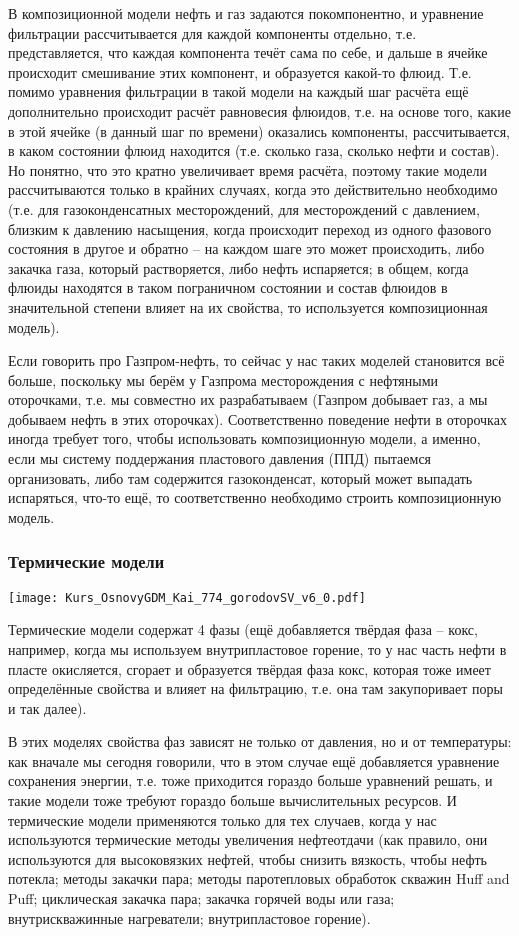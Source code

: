 \documentclass[main.tex]{subfiles}
\begin{document}
В композиционной модели нефть и газ задаются покомпонентно, и уравнение фильтрации рассчитывается для каждой компоненты отдельно, т.е. представляется, что каждая компонента течёт сама по себе, и дальше в ячейке происходит смешивание этих компонент, и образуется какой-то флюид.
Т.е. помимо уравнения фильтрации в такой модели на каждый шаг расчёта ещё дополнительно происходит расчёт равновесия флюидов, т.е. на основе того, какие в этой ячейке (в данный шаг по времени) оказались компоненты, рассчитывается, в каком состоянии флюид находится (т.е. сколько газа, сколько нефти и состав).
Но понятно, что это кратно увеличивает время расчёта, поэтому такие модели рассчитываются только в крайних случаях, когда это действительно необходимо (т.е. для газоконденсатных месторождений, для месторождений с давлением, близким к давлению насыщения, когда происходит переход из одного фазового состояния в другое и обратно -- на каждом шаге это может происходить, либо закачка газа, который растворяется, либо нефть испаряется; в общем, когда флюиды находятся в таком пограничном состоянии и состав флюидов в значительной степени влияет на их свойства, то используется композиционная модель).

Если говорить про Газпром-нефть, то сейчас у нас таких моделей становится всё больше, поскольку мы берём у Газпрома месторождения с нефтяными оторочками, т.е. мы совместно их разрабатываем (Газпром добывает газ, а мы добываем нефть в этих оторочках).
Соответственно поведение нефти в оторочках иногда требует того, чтобы использовать композиционную модели, а именно, если мы систему поддержания пластового давления (ППД) пытаемся организовать, либо там содержится газоконденсат, который может выпадать испаряться, что-то ещё, то соответственно необходимо строить композиционную модель.

\subsubsection{Термические модели}

\texttt{[image: Kurs\_OsnovyGDM\_Kai\_774\_gorodovSV\_v6\_0.pdf]}

Термические модели содержат 4 фазы (ещё добавляется твёрдая фаза -- кокс, например, когда мы используем внутрипластовое горение, то у нас часть нефти в пласте окисляется, сгорает и образуется твёрдая фаза кокс, которая тоже имеет определённые свойства и влияет на фильтрацию, т.е. она там закупоривает поры и так далее).

В этих моделях свойства фаз зависят не только от давления, но и от температуры: как вначале мы сегодня говорили, что в этом случае ещё добавляется уравнение сохранения энергии, т.е. тоже приходится гораздо больше уравнений решать, и такие модели тоже требуют гораздо больше вычислительных ресурсов.
И термические модели применяются только для тех случаев, когда у нас используются термические методы увеличения нефтеотдачи (как правило, они используются для высоковязких нефтей, чтобы снизить вязкость, чтобы нефть потекла; методы закачки пара; методы паротепловых обработок скважин Huff and Puff; циклическая закачка пара; закачка горячей воды или газа; внутрискважинные нагреватели; внутрипластовое горение).
\end{document}
